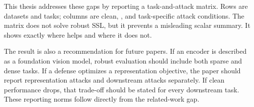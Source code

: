 This thesis addresses these gaps by reporting a task-and-attack matrix. Rows are datasets and tasks; columns are clean, \EmbedAttack, and task-specific attack conditions. The matrix does not solve robust SSL, but it prevents a misleading scalar summary. It shows exactly where \DeACL helps and where it does not.

The result is also a recommendation for future papers. If an encoder is described as a foundation vision model, robust evaluation should include both sparse and dense tasks. If a defense optimizes a representation objective, the paper should report representation attacks and downstream attacks separately. If clean performance drops, that trade-off should be stated for every downstream task. These reporting norms follow directly from the related-work gap.
